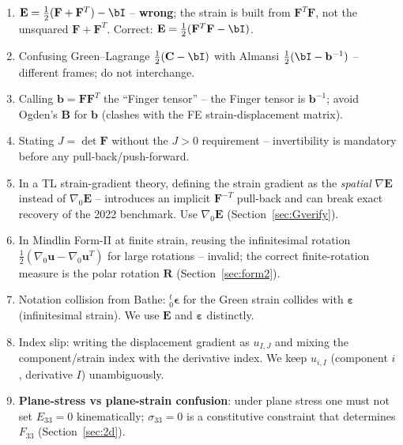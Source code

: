 \documentclass[11pt]{article}
\newcommand{\gradz}{\nabla_{0}}
\newcommand{\bu}{\mathbf{u}}
\newcommand{\bF}{\mathbf{F}}
\newcommand{\bC}{\mathbf{C}}
\newcommand{\bb}{\mathbf{b}}
\newcommand{\bE}{\mathbf{E}}
\newcommand{\bep}{\boldsymbol{\varepsilon}}
\newcommand{\bR}{\mathbf{R}}
\newcommand{\gradz}{\nabla_{0}}
\newcommand{\bu}{\mathbf{u}}
\newcommand{\bF}{\mathbf{F}}
\newcommand{\bC}{\mathbf{C}}
\newcommand{\bb}{\mathbf{b}}
\newcommand{\bE}{\mathbf{E}}
\newcommand{\bep}{\boldsymbol{\varepsilon}}
\newcommand{\bR}{\mathbf{R}}
\begin{document}
\begin{enumerate}
\item $\bE=\tfrac12(\bF+\bF^{T})-\bI$ -- \textbf{wrong}; the strain is
built from $\bF^{T}\bF$, not the unsquared $\bF+\bF^{T}$. Correct:
$\bE=\tfrac12(\bF^{T}\bF-\bI)$.

\item Confusing Green--Lagrange $\tfrac12(\bC-\bI)$ with Almansi
$\tfrac12(\bI-\bb^{-1})$ -- different frames; do not interchange.

\item Calling $\bb=\bF\bF^{T}$ the ``Finger tensor'' -- the Finger
tensor is $\bb^{-1}$; avoid Ogden's $\mathbf{B}$ for $\bb$ (clashes
with the FE strain-displacement matrix).

\item Stating $J=\det\bF$ without the $J>0$ requirement -- invertibility
is mandatory before any pull-back/push-forward.

\item In a TL strain-gradient theory, defining the strain gradient as the
\emph{spatial} $\nabla\bE$ instead of $\gradz\bE$ -- introduces an
implicit $\bF^{-T}$ pull-back and can break exact recovery of the 2022
benchmark. Use $\gradz\bE$ (Section~\ref{sec:Gverify}).

\item In Mindlin Form-II at finite strain, reusing the infinitesimal
rotation $\tfrac12(\gradz\bu-\gradz\bu^{T})$ for large rotations --
invalid; the correct finite-rotation measure is the polar rotation
$\bR$ (Section~\ref{sec:form2}).

\item Notation collision from Bathe: ${}^{t}_{0}\boldsymbol{\epsilon}$
for the Green strain collides with $\boldsymbol{\varepsilon}$
(infinitesimal strain). We use $\bE$ and $\bep$ distinctly.

\item Index slip: writing the displacement gradient as $u_{I,J}$ and
mixing the component/strain index with the derivative index. We keep
$u_{i,I}$ (component $i$, derivative $I$) unambiguously.

\item \textbf{Plane-stress vs plane-strain confusion}: under plane
stress one must not set $E_{33}=0$ kinematically; $\sigma_{33}=0$ is a
constitutive constraint that determines $F_{33}$ (Section~\ref{sec:2d}).
\end{enumerate}

\end{document}
